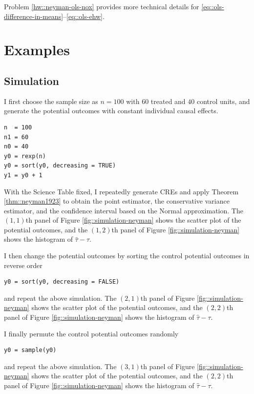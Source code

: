 Problem \ref{hw::neyman-ols-nox} provides more technical details for \eqref{eq::ols-difference-in-means}--\eqref{eq::ols-ehw}. 
 



 

 
\section{Examples} 


\subsection{Simulation}
\label{sec::simulation-neyman-formula}



I first choose the sample size as $n=100$ with $60$ treated and $40$ control units, and generate the potential outcomes with constant individual causal effects. 
\begin{lstlisting}
n  = 100
n1 = 60
n0 = 40
y0 = rexp(n)
y0 = sort(y0, decreasing = TRUE)
y1 = y0 + 1
 \end{lstlisting}
With the Science Table fixed, I repeatedly generate CREs and apply Theorem \ref{thm::neyman1923} to obtain the point estimator, the conservative variance estimator, and the confidence interval based on the Normal approximation. 
The $(1,1)$th panel of Figure \ref{fig::simulation-neyman} shows the scatter plot of the potential outcomes,
and the $(1,2)$th panel of Figure \ref{fig::simulation-neyman}  shows the histogram of $\hat{\tau} - \tau$. 

I then change the potential outcomes by sorting the control potential outcomes in reverse order
\begin{lstlisting}
y0 = sort(y0, decreasing = FALSE)
 \end{lstlisting}
and repeat the above simulation. 
The $(2,1)$th panel of Figure \ref{fig::simulation-neyman} shows the scatter plot of the potential outcomes,
and the $(2,2)$th panel of Figure \ref{fig::simulation-neyman}  shows the histogram of $\hat{\tau} - \tau$. 




I finally permute the control potential outcomes randomly 
 \begin{lstlisting}
y0 = sample(y0)
 \end{lstlisting}
 and repeat the above simulation. 
 The $(3,1)$th panel of Figure \ref{fig::simulation-neyman} shows the scatter plot of the potential outcomes,
and the $(2,2)$th panel of Figure \ref{fig::simulation-neyman}  shows the histogram of $\hat{\tau} - \tau$. 


